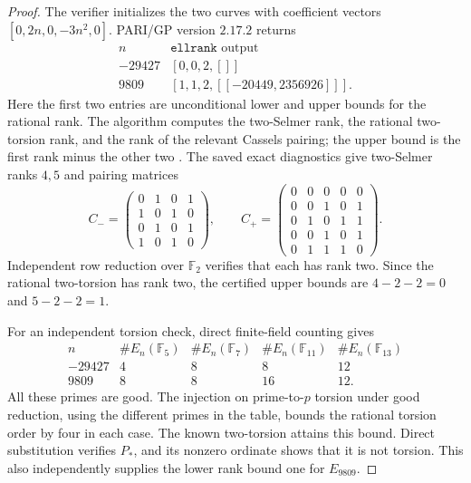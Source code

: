\documentclass[11pt,a4paper]{article}
\theoremstyle{definition}\newtheorem{definition}[theorem]{Definition}
\newcommand{\F}{\mathbb F}
\begin{document}
\begin{proof}
The verifier initializes the two curves with coefficient vectors
$[0,2n,0,-3n^2,0]$.  PARI/GP version $2.17.2$ returns
\[
 \begin{array}{c|c}
 n&\texttt{ellrank}\text{ output}\\\hline
 -29427&[0,0,2,[]]\\
 9809&[1,1,2,[[-20449,2356926]]].
 \end{array}
\]
Here the first two entries are unconditional lower and upper bounds
for the rational rank.  The algorithm computes the two-Selmer rank,
the rational two-torsion rank, and the rank of the relevant Cassels
pairing; the upper bound is the first rank minus the other two
\cite{PARI}.  The saved exact diagnostics give two-Selmer ranks $4,5$
and pairing matrices
\[
 C_-=
 \begin{pmatrix}
 0&1&0&1\\1&0&1&0\\0&1&0&1\\1&0&1&0
 \end{pmatrix},\qquad
 C_+=
 \begin{pmatrix}
 0&0&0&0&0\\
 0&0&1&0&1\\
 0&1&0&1&1\\
 0&0&1&0&1\\
 0&1&1&1&0
 \end{pmatrix}.
\]
Independent row reduction over $\F_2$ verifies that each has rank
two.  Since the rational two-torsion has rank two, the certified
upper bounds are $4-2-2=0$ and $5-2-2=1$.

For an independent torsion check, direct finite-field counting gives
\[
 \begin{array}{c|rrrr}
 n&\#E_n(\F_5)&\#E_n(\F_7)&\#E_n(\F_{11})&\#E_n(\F_{13})\\\hline
 -29427&4&8&8&12\\
 9809&8&8&16&12.
 \end{array}
\]
All these primes are good.  The injection on prime-to-$p$ torsion
under good reduction, using the different primes in the table,
bounds the rational torsion order by four in each case.  The known
two-torsion attains this bound.  Direct substitution verifies $P_*$,
and its nonzero ordinate shows that it is not torsion.  This also
independently supplies the lower rank bound one for $E_{9809}$.
\end{proof}
\end{document}
